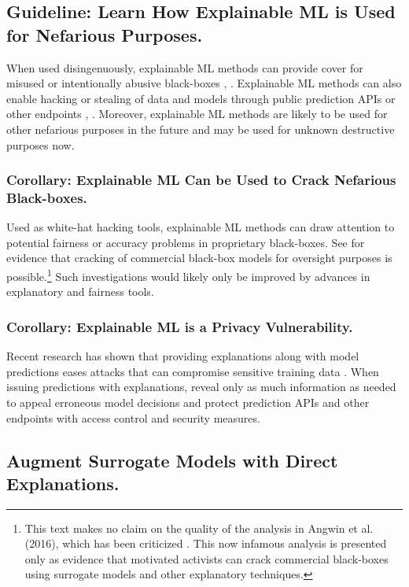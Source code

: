 \documentclass[sigconf]{acmart}
\begin{document}
\subsection{Guideline: Learn How Explainable ML is Used for Nefarious Purposes.} \label{sec:nefarious}

When used disingenuously, explainable ML methods can provide cover for misused or intentionally abusive black-boxes \cite{fair_washing}, \cite{please_stop}. Explainable ML methods can also enable hacking or stealing of data and models through public prediction APIs or other endpoints \cite{membership_inference}, \cite{model_stealing}. Moreover, explainable ML methods are likely to be used for other nefarious purposes in the future and may be used for unknown destructive purposes now. 

\subsubsection{Corollary: Explainable ML Can be Used to Crack Nefarious Black-boxes.} Used as white-hat hacking tools, explainable ML methods can draw attention to potential fairness or accuracy problems in proprietary black-boxes. See \citet{angwin16} for evidence that cracking of commercial black-box models for oversight purposes is possible.\footnote{This text makes no claim on the quality of the analysis in Angwin et al. (2016), which has been criticized \cite{flores2016false}. This now infamous analysis is presented only as evidence that motivated activists can crack commercial black-boxes using surrogate models and other explanatory techniques.} Such investigations would likely only be improved by advances in explanatory and fairness tools.

\subsubsection{Corollary: Explainable ML is a Privacy Vulnerability.} Recent research has shown that providing explanations along with model predictions eases attacks that can compromise sensitive training data \cite{shokri2019privacy}. When issuing predictions with explanations, reveal only as much information as needed to appeal erroneous model decisions and protect prediction APIs and other endpoints with access control and security measures. 

\subsection{Augment Surrogate Models with Direct Explanations.} \label{sec:surrogate}
\end{document}
